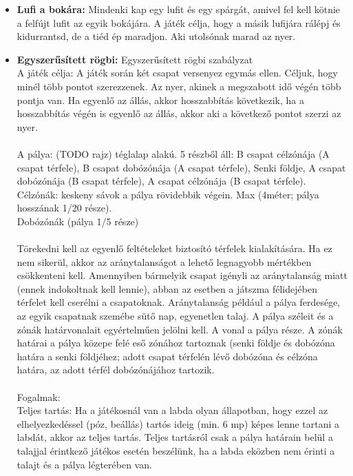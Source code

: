 \documentclass[a4paper, 12pt, twoside, openright]{article}
\begin{document}
\begin{itemize}
\item \textbf{Lufi a bokára:} Mindenki kap egy lufit és egy spárgát, amivel fel kell kötnie a felfújt lufit az egyik bokájára. A játék célja, hogy a másik lufijára rálépj és kidurrantsd, de a tiéd ép maradjon. Aki utolsónak marad az nyer.


\item \textbf{Egyszerűsített rögbi:} Egyszerűsített rögbi szabályzat\\
A játék célja: A játék során két csapat versenyez egymás ellen. Céljuk, hogy minél több pontot szerezzenek. Az nyer, akinek a megszabott idő végén több pontja van. Ha egyenlő az állás, akkor hosszabbítás következik, ha a hosszabbítás végén is egyenlő az állás, akkor aki a következő pontot szerzi az nyer.\\
\\
A pálya: (TODO rajz) téglalap alakú. 5 részből áll:
B csapat célzónája (A csapat térfele), B csapat dobózónája (A csapat térfele), Senki földje, A csapat dobózónája (B csapat térfele), A csapat célzónája (B csapat térfele).\\
Célzónák: keskeny sávok a pálya rövidebbik végein. Max (4méter; pálya hosszának 1/20 része).\\
Dobózónák (pálya 1/5 része)\\
\\
Törekedni kell az egyenlő feltételeket biztosító térfelek kialakítására. Ha ez nem sikerül, akkor az aránytalanságot a lehető legnagyobb mértékben csökkenteni kell. Amennyiben bármelyik csapat igényli az aránytalanság miatt (ennek indokoltnak kell lennie), abban az esetben a játszma félidejében térfelet kell cserélni a csapatoknak. Aránytalanság például a pálya ferdesége, az egyik csapatnak szemébe sütő nap, egyenetlen talaj.
A pálya széleit és a zónák határvonalait egyértelműen jelölni kell. A vonal a pálya része. A zónák határai a pálya közepe felé eső zónához tartoznak (senki földje és dobózóna határa a senki földjéhez; adott csapat térfelén lévő dobózóna és célzóna határa, az adott térfél dobózónájához tartozik.\\
\\
Fogalmak:\\
Teljes tartás: Ha a játékosnál van a labda olyan állapotban, hogy ezzel az elhelyezkedéssel (póz, beállás) tartós ideig (min. 6 mp) képes lenne tartani a labdát, akkor az teljes tartás. Teljes tartásról csak a pálya határain belül a talajjal érintkező játékos esetén beszélünk, ha a labda eközben nem érinti a talajt és a pálya légterében van.\\

\end{itemize}
\end{document}
